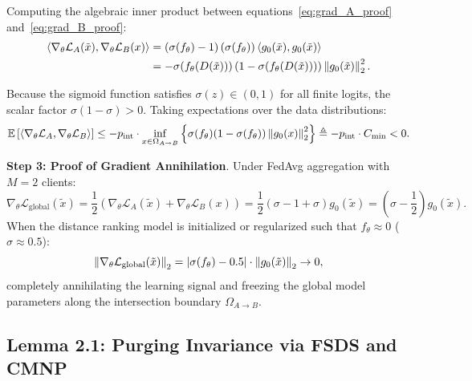 \begin{IEEEproof}
Computing the algebraic inner product between equations~\eqref{eq:grad_A_proof} and~\eqref{eq:grad_B_proof}:
\begin{align}
\left\langle\nabla_\theta \mathcal{L}_A(\tilde{x}),\nabla_\theta \mathcal{L}_B(x)\right\rangle &= \left(\sigma(f_\theta) - 1\right) \left(\sigma(f_\theta)\right) \left\langle g_0(\tilde{x}),g_0(\tilde{x})\right\rangle \notag \\
&= -\sigma(f_\theta(D(\tilde{x}))) \left(1 - \sigma(f_\theta(D(\tilde{x})))\right) \left\lVert g_0(\tilde{x})\right\rVert_2^2.
\end{align}

Because the sigmoid function satisfies $\sigma(z) \in (0, 1)$ for all finite logits, the scalar factor $\sigma(1 - \sigma) > 0$. Taking expectations over the data distributions:
\begin{equation}
\mathbb{E}\left[\left\langle\nabla_\theta \mathcal{L}_A,\nabla_\theta \mathcal{L}_B\right\rangle\right] \le -p_{\text{int}} \cdot \inf_{x \in \Omega_{A \to B}} \left\{ \sigma(f_\theta) (1 - \sigma(f_\theta)) \left\lVert g_0(x)\right\rVert_2^2 \right\} \triangleq -p_{\text{int}} \cdot C_{\min} < 0.
\end{equation}

\textbf{Step 3: Proof of Gradient Annihilation}.
Under FedAvg aggregation with $M=2$ clients:
\begin{equation}
\nabla_\theta \mathcal{L}_{\text{global}}(\tilde{x}) = \frac{1}{2}\left( \nabla_\theta \mathcal{L}_A(\tilde{x}) + \nabla_\theta \mathcal{L}_B(x) \right) = \frac{1}{2}\left( \sigma - 1 + \sigma \right) g_0(\tilde{x}) = \left(\sigma - \frac{1}{2}\right) g_0(\tilde{x}).
\end{equation}
When the distance ranking model is initialized or regularized such that $f_\theta \approx 0$ ($\sigma \approx 0.5$):
\begin{equation}
\left\lVert\nabla_\theta \mathcal{L}_{\text{global}}(\tilde{x})\right\rVert_2 = \left| \sigma(f_\theta) - 0.5 \right| \cdot \left\lVert g_0(\tilde{x})\right\rVert_2 \to 0,
\end{equation}
completely annihilating the learning signal and freezing the global model parameters along the intersection boundary $\Omega_{A \to B}$.
\end{IEEEproof}

\subsection{Lemma 2.1: Purging Invariance via FSDS and CMNP}
\label{subsec:proof_lemma1}

